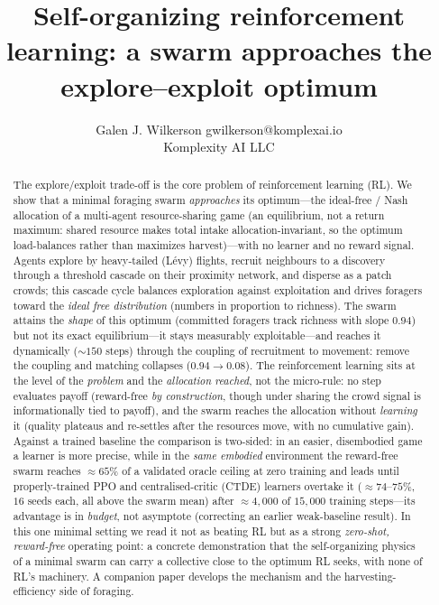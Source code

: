 \documentclass{article}
\title{Self-organizing reinforcement learning: a swarm approaches the explore--exploit optimum}
\author{}
\author{\name Galen J. Wilkerson \email gwilkerson@komplexai.io \\ \addr Komplexity AI LLC}
\begin{document}
\maketitle

\begin{abstract}
The explore/exploit trade-off is the core problem of reinforcement learning (RL). We show that a minimal
foraging swarm \emph{approaches} its optimum---the ideal-free / Nash allocation of a multi-agent resource-sharing
game (an equilibrium, not a return maximum: shared resource makes total intake allocation-invariant, so the
optimum load-balances rather than maximizes harvest)---with no learner and no reward signal. Agents explore by
heavy-tailed (L\'evy) flights, recruit neighbours to a discovery through a threshold cascade on their proximity
network, and disperse as a patch crowds; this cascade cycle balances exploration against exploitation and drives
foragers toward the \emph{ideal free distribution} (numbers in proportion to richness). The swarm attains the
\emph{shape} of this optimum (committed foragers track richness with slope $0.94$) but not its exact
equilibrium---it stays measurably exploitable---and reaches it dynamically (${\sim}150$ steps) through the
coupling of recruitment to movement: remove the coupling and matching collapses ($0.94\!\to\!0.08$). The
reinforcement learning sits at the level of the \emph{problem} and the \emph{allocation reached}, not the
micro-rule: no step evaluates payoff (reward-free \emph{by construction}, though under sharing the crowd signal
is informationally tied to payoff), and the swarm reaches the allocation without \emph{learning} it (quality
plateaus and re-settles after the resources move, with no cumulative gain). Against a trained baseline the
comparison is two-sided: in an easier, disembodied game a learner is more precise, while in the \emph{same
embodied} environment the reward-free swarm reaches ${\approx}65\%$ of a validated oracle ceiling at zero
training and leads until properly-trained PPO and centralised-critic (CTDE) learners overtake it
(${\approx}74$--$75\%$, $16$ seeds each, all above the swarm mean) after ${\approx}4{,}000$ of $15{,}000$ training
steps---its advantage is in \emph{budget}, not asymptote (correcting an earlier weak-baseline result). In this
one minimal setting we read it not as beating RL but as a strong \emph{zero-shot, reward-free} operating point:
a concrete demonstration that the self-organizing physics of a minimal swarm can carry a collective close to the
optimum RL seeks, with none of RL's machinery. A companion paper develops the mechanism and the
harvesting-efficiency side of foraging.
\end{abstract}
\end{document}
